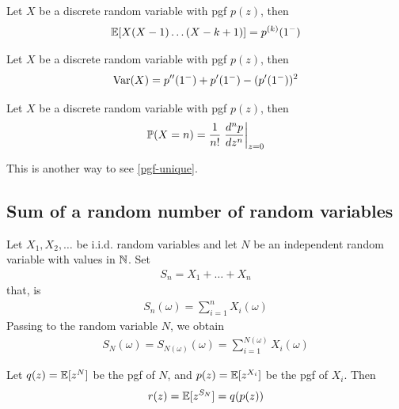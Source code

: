 \documentclass{../template/note}
\begin{document}
    \begin{proposition}
        Let \(X\) be a discrete random variable with pgf \(p(z)\), then
        \begin{align*}
            \mathbb E[X(X-1)\dots(X-k+1)] = p^{(k)}(1^-)
        \end{align*}
    \end{proposition}
    
    \begin{corollary}
        Let \(X\) be a discrete random variable with pgf \(p(z)\), then
        \begin{align*}
            \operatorname{Var}(X) = p''(1^-) + p'(1^-) - (p'(1^-))^2
        \end{align*}
    \end{corollary}
    
    \begin{proposition}
        Let \(X\) be a discrete random variable with pgf \(p(z)\), then
        \begin{align*}
            \mathbb P(X = n) = \frac 1{n!}\left.\frac{d^np}{dz^n}\right|_{z=0}
        \end{align*}
    \end{proposition}
    
    \begin{remark*}
        This is another way to see \cref{pgf-unique}.
    \end{remark*}
    
    \subsection{Sum of a random number of random variables}

    Let \(X_1, X_2, \dots\) be i.i.d. random variables and let \(N\) be an independent random variable with values in \(\mathbb N\). Set
    \begin{align*}
        S_n = X_1 + \dots + X_n
    \end{align*}
    that, is
    \begin{align*}
        S_n(\omega) = \sum_{i=1}^n X_i(\omega)
    \end{align*}
    Passing to the random variable \(N\), we obtain
    \begin{align*}
        S_N(\omega) = S_{N(\omega)}(\omega) = \sum_{i=1}^{N(\omega)} X_i(\omega)
    \end{align*}
    
    \begin{lemma}
        Let \(q(z) = \mathbb E[z^N]\) be the pgf of \(N\), and \(p(z) = \mathbb E[z^{X_i}]\) be the pgf of \(X_i\). Then
        \begin{align*}
            r(z) = \mathbb E[z^{S_N}] = q(p(z))
        \end{align*}
    \end{lemma}
    
\end{document}
